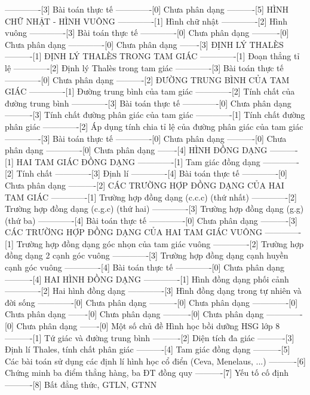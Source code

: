 -------------[3] Bài toán thực tế
-------------[0] Chưa phân dạng
----------[5] HÌNH CHỮ NHẬT - HÌNH VUÔNG
-------------[1] Hình chữ nhật
-------------[2] Hình vuông
-------------[3] Bài toán thực tế
-------------[0] Chưa phân dạng
----------[0] Chưa phân dạng
-------------[0] Chưa phân dạng
-------[3] ĐỊNH LÝ THALÈS
----------[1] ĐỊNH LÝ THALÈS TRONG TAM GIÁC
-------------[1] Đoạn thẳng tỉ lệ
-------------[2] Định lý Thalès trong tam giác
-------------[3] Bài toán thực tế
-------------[0] Chưa phân dạng
----------[2] ĐƯỜNG TRUNG BÌNH CỦA TAM GIÁC
-------------[1] Đường trung bình của tam giác
-------------[2] Tính chất của đường trung bình
-------------[3] Bài toán thực tế
-------------[0] Chưa phân dạng
----------[3] Tính chất đường phân giác của tam giác
-------------[1] Tính chất đường phân giác
-------------[2] Áp dụng tính chia tỉ lệ của đường phân giác của tam giác
-------------[3] Bài toán thực tế
-------------[0] Chưa phân dạng
----------[0] Chưa phân dạng
-------------[0] Chưa phân dạng
-------[4] HÌNH ĐỒNG DẠNG
----------[1] HAI TAM GIÁC ĐỒNG DẠNG
-------------[1] Tam giác đồng dạng
-------------[2] Tính chất
-------------[3] Định lí
-------------[4] Bài toán thực tế
-------------[0] Chưa phân dạng
----------[2] CÁC TRƯỜNG HỢP ĐỒNG DẠNG CỦA HAI TAM GIÁC
-------------[1] Trường hợp đồng dạng (c.c.c) (thứ nhất)
-------------[2] Trường hợp đồng dạng (c.g.c) (thứ hai)
-------------[3] Trường hợp đồng dạng (g.g) (thứ ba)
-------------[4] Bài toán thực tế
-------------[0] Chưa phân dạng
----------[3] CÁC TRƯỜNG HỢP ĐỒNG DẠNG CỦA HAI TAM GIÁC VUÔNG
-------------[1] Trường hợp đồng dạng góc nhọn của tam giác vuông
-------------[2] Trường hợp đồng dạng 2 cạnh góc vuông
-------------[3] Trường hợp đồng dạng cạnh huyền cạnh góc vuông
-------------[4] Bài toán thực tế
-------------[0] Chưa phân dạng
----------[4] HAI HÌNH ĐỒNG DẠNG
-------------[1] Hình đồng dạng phối cảnh
-------------[2] Hai hình đồng dạng
-------------[3] Hình đồng dạng trong tự nhiên và đời sống
-------------[0] Chưa phân dạng
----------[0] Chưa phân dạng
-------------[0] Chưa phân dạng
-------[0] Chưa phân dạng
----------[0] Chưa phân dạng
-------------[0] Chưa phân dạng
-------[0] Một số chủ đề Hình học bồi dưỡng HSG lớp 8
----------[1] Tứ giác và đường trung bình
----------[2] Diện tích đa giác
----------[3] Định lí Thales, tính chất phân giác
----------[4] Tam giác đồng dạng
----------[5] Các bài toán sử dụng các định lí hình học cổ điển (Ceva, Menelaus, ...)
----------[6] Chứng minh ba điểm thẳng hàng, ba ĐT đồng quy
----------[7] Yếu tố cố định
----------[8] Bất đẳng thức, GTLN, GTNN
